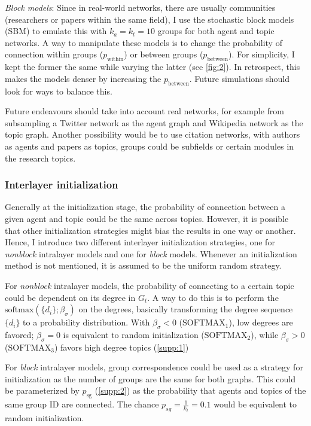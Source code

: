 \textit{Block models}: Since in real-world networks, there are usually communities (researchers or papers within the same field), I use the stochastic block models (SBM) to emulate this with $k_a = k_t = 10$ groups for both agent and topic networks. A way to manipulate these models is to change the probability of connection within groups ($p_{\mathrm{within}}$) or between groups ($p_{\mathrm{between}}$). For simplicity, I kept the former the same while varying the latter (see \autoref{fig:2}). In retrospect, this makes the models denser by increasing the $p_{\mathrm{between}}$. Future simulations should look for ways to balance this.

Future endeavours should take into account real networks, for example from subsampling a Twitter network as the agent graph and Wikipedia network as the topic graph. Another possibility would be to use citation networks, with authors as agents and papers as topics, groups could be subfields or certain modules in the research topics.

\subsubsection*{Interlayer initialization}

Generally at the initialization stage, the probability of connection between a given agent and topic could be the same across topics. However, it is possible that other initialization strategies might bias the results in one way or another. Hence, I introduce two different interlayer initialization strategies, one for \textit{nonblock} intralayer models and one for \textit{block} models. Whenever an initialization method is not mentioned, it is assumed to be the uniform random strategy.

For \textit{nonblock} intralayer models, the probability of connecting to a certain topic could be dependent on its degree in $G_t$. A way to do this is to perform the $\mathrm{softmax}\left(\{d_i\}; \beta_{\sigma}\right)$ on the degrees, basically transforming the degree sequence $\{d_i\}$ to a probability distribution. With $\beta_{\sigma} < 0$ ($\mathrm{SOFTMAX}_1$), low degrees are favored; $\beta_{\sigma} = 0$ is equivalent to random initialization ($\mathrm{SOFTMAX}_2$), while $\beta_{\sigma} > 0$  ($\mathrm{SOFTMAX}_3$) favors high degree topics (\autoref{supp:1})

For \textit{block} intralayer models, group correspondence could be used as a strategy for initialization as the number of groups are the same for both graphs. This could be parameterized by $p_{\mathrm{sg}}$ (\autoref{supp:2}) as the probability that agents and topics of the same group ID are connected. The chance $p_{sg} = \frac{1}{k_t} = 0.1$ would be equivalent to random initialization.


